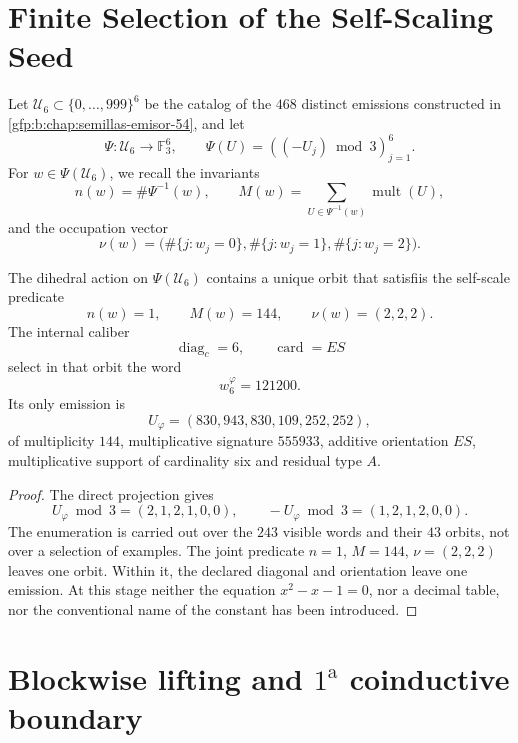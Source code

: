
\label{gfp:b:chap:biografia-completa-phi}

\section{Finite Selection of the Self-Scaling Seed}

Let \(\mathcal U_6\subset\{0,\ldots,999\}^6\) be the catalog of the
\(468\) distinct emissions constructed in
\cref{gfp:b:chap:semillas-emisor-54}, and let
\[
 \Psi:\mathcal U_6\longrightarrow\mathbb F_3^6,
 \qquad
 \Psi(U)=((-U_j)\bmod3)_{j=1}^{6}.
\]
For \(w\in\Psi(\mathcal U_6)\), we recall the invariants
\[
 n(w)=\#\Psi^{-1}(w),
 \qquad
 M(w)=\sum_{U\in\Psi^{-1}(w)}\operatorname{mult}(U),
\]
and the occupation vector
\[
 \nu(w)=
 \bigl(\#\{j:w_j=0\},\#\{j:w_j=1\},\#\{j:w_j=2\}\bigr).
\]

\begin{theorem}
\label{gfp:b:thm:seleccion-orbital-phi}
The dihedral action on \(\Psi(\mathcal U_6)\) contains a unique orbit
that satisfiis the self-scale predicate
\[
 n(w)=1,
 \qquad
 M(w)=144,
 \qquad
 \nu(w)=(2,2,2).
\]
The internal caliber
\[
 \operatorname{diag}_c=6,
 \qquad
 \operatorname{card}=ES
\]
select in that orbit the word
\[
 \boxed{w_6^{\varphi}=121200.}
\]
Its only emission is
\[
 \boxed{U_{\varphi}=(830,943,830,109,252,252),}
\]
of multiplicity \(144\), multiplicative signature \(555933\), additive
orientation \(ES\), multiplicative support of cardinality six and residual type
\(A\).
\end{theorem}

\begin{proof}
The direct projection gives
\[
 U_{\varphi}\bmod3=(2,1,2,1,0,0),
 \qquad
 -U_{\varphi}\bmod3=(1,2,1,2,0,0).
\]
The enumeration is carried out over the \(243\) visible words and their
\(43\) orbits, not over a selection of examples. The joint predicate
\(n=1\), \(M=144\), \(\nu=(2,2,2)\) leaves one orbit. Within it, the
declared diagonal and orientation leave one emission. At this stage neither
the equation \(x^2-x-1=0\), nor a decimal table, nor the
conventional name of the constant has been introduced.
\end{proof}

\section{Blockwise lifting and \(1^{\mathrm a}\) coinductive boundary}

